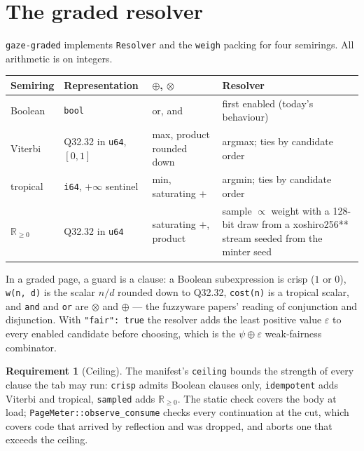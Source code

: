 \documentclass[11pt]{article}
\theoremstyle{definition}
\newtheorem{requirement}{Requirement}
\theoremstyle{remark}
\newcommand{\code}[1]{\texttt{#1}}
\begin{document}
\section{The graded resolver}\label{sec:graded}

\code{gaze-graded} implements \code{Resolver} and the \code{weigh} packing for four
semirings. All arithmetic is on integers.

\begin{center}\small
\begin{tabularx}{\linewidth}{@{}p{2.1cm}p{3.4cm}p{2.8cm}X@{}}
\toprule
Semiring & Representation & $\oplus$, $\otimes$ & Resolver\\
\midrule
Boolean & \code{bool} & or, and & first enabled (today's behaviour)\\
Viterbi & Q32.32 in \code{u64}, $[0,1]$ & max, product rounded down & argmax; ties by candidate order\\
tropical & \code{i64}, $+\infty$ sentinel & min, saturating $+$ & argmin; ties by candidate order\\
$\mathbb{R}_{\geq0}$ & Q32.32 in \code{u64} & saturating $+$, product & sample $\propto$ weight with a 128-bit draw from a xoshiro256** stream seeded from the minter seed\\
\bottomrule
\end{tabularx}
\end{center}

\noindent
In a graded page, a guard is a clause: a Boolean subexpression is crisp ($1$ or
$0$), \code{w(n, d)} is the scalar $n/d$ rounded down to Q32.32, \code{cost(n)} is a
tropical scalar, and \code{and} and \code{or} are $\otimes$ and $\oplus$ --- the
fuzzyware papers' reading of conjunction and disjunction. With \code{"fair": true}
the resolver adds the least positive value $\varepsilon$ to every enabled candidate
before choosing, which is the $\psi\oplus\varepsilon$ weak-fairness combinator.

\begin{requirement}[Ceiling]
The manifest's \code{ceiling} bounds the strength of every clause the tab may run:
\code{crisp} admits Boolean clauses only, \code{idempotent} adds Viterbi and tropical,
\code{sampled} adds $\mathbb{R}_{\geq0}$. The static check covers the body at load;
\code{PageMeter::observe\_consume} checks every continuation at the cut, which covers
code that arrived by reflection and was dropped, and aborts one that exceeds the
ceiling.
\end{requirement}
\end{document}
